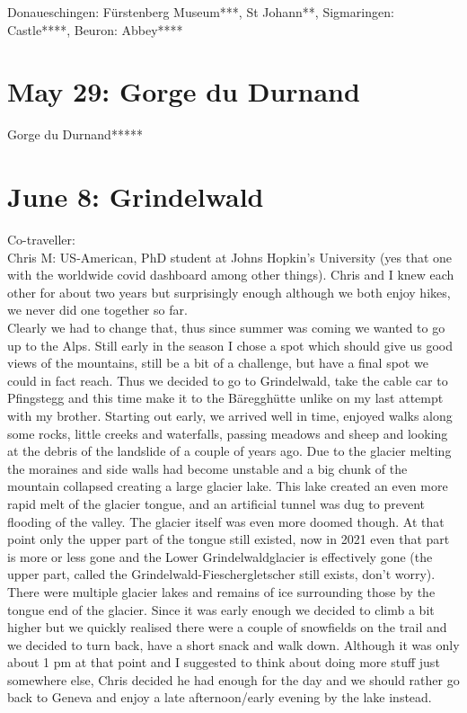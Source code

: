 Donaueschingen: F\"urstenberg Museum***, St Johann**, Sigmaringen: Castle****, Beuron: Abbey****

\section{May 29: Gorge du Durnand}
\label{Durnand2014}

Gorge du Durnand*****

\section{June 8: Grindelwald}
\label{Grindelwald2014}

Co-traveller:\\
Chris M: US-American, PhD student at Johns Hopkin's University (yes that one with the worldwide covid dashboard among other things). Chris and I knew each other for about two years but surprisingly enough although we both enjoy hikes, we never did one together so far. \\

Clearly we had to change that, thus since summer was coming we wanted to go up to the Alps. Still early in the season I chose a spot which should give us good views of the mountains, still be a bit of a challenge, but have a final spot we could in fact reach. Thus we decided to go to Grindelwald, take the cable car to Pfingstegg and this time make it to the B\"areggh\"utte unlike on my last attempt with my brother. Starting out early, we arrived well in time, enjoyed walks along some rocks, little creeks and waterfalls, passing meadows and sheep and looking at the debris of the landslide of a couple of years ago. Due to the glacier melting the moraines and side walls had become unstable and a big chunk of the mountain collapsed creating a large glacier lake. This lake created an even more rapid melt of the glacier tongue, and an artificial tunnel was dug to prevent flooding of the valley. The glacier itself was even more doomed though. At that point only the upper part of the tongue still existed, now in 2021 even that part is more or less gone and the Lower Grindelwaldglacier is effectively gone (the upper part, called the Grindelwald-Fieschergletscher still exists, don't worry). There were multiple glacier lakes and remains of ice surrounding those by the tongue end of the glacier. Since it was early enough we decided to climb a bit higher but we quickly realised there were a couple of snowfields on the trail and we decided to turn back, have a short snack and walk down. Although it was only about 1 pm at that point and I suggested to think about doing more stuff just somewhere else, Chris decided he had enough for the day and we should rather go back to Geneva and enjoy a late afternoon/early evening by the lake instead.\\

